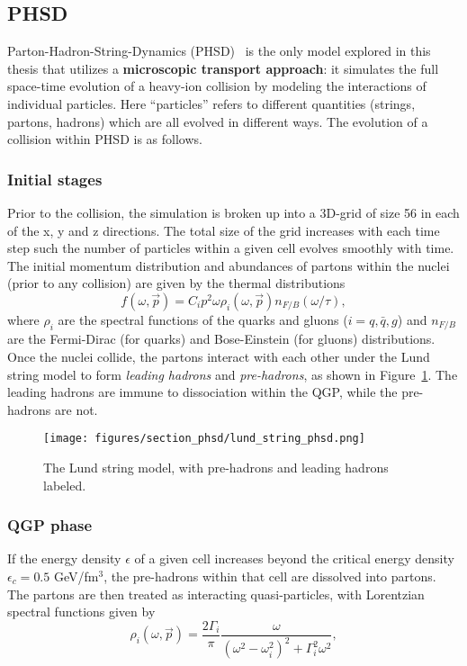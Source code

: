 \subsection{PHSD}

Parton-Hadron-String-Dynamics (PHSD)~\cite{PHSD1, PHSD2} is the only model explored in this thesis that utilizes a \textbf{microscopic transport approach}: it simulates the full space-time evolution of a heavy-ion collision by modeling the interactions of individual particles. Here ``particles'' refers to different quantities (strings, partons, hadrons) which are all evolved in different ways. The evolution of a collision within PHSD is as follows.

\subsubsection{Initial stages}
Prior to the collision, the simulation is broken up into a 3D-grid of size 56 in each of the x, y and z directions. The total size of the grid increases with each time step such the number of particles within a given cell evolves smoothly with time. The initial momentum distribution and abundances of partons within the nuclei (prior to any collision) are given by the thermal distributions
\begin{equation}
    f(\omega, \vec{p}) = C_i p^2 \omega \rho_i(\omega, \vec{p}) n_{F / B}(\omega / \tau),
\end{equation}
where $\rho_i$ are the spectral functions of the quarks and gluons ($i = q, \bar{q}, g$) and $n_{F / B}$ are the Fermi-Dirac (for quarks) and Bose-Einstein (for gluons) distributions. Once the nuclei collide, the partons interact with each other under the Lund string model to form \textit{leading hadrons} and \textit{pre-hadrons}, as shown in Figure~\ref{fig:lund_string_phsd}. The leading hadrons are immune to dissociation within the QGP, while the pre-hadrons are not. 

\begin{figure}[ht]
    \centering
    \texttt{[image: figures/section\_phsd/lund\_string\_phsd.png]}
    \caption{The Lund string model, with pre-hadrons and leading hadrons labeled.}
    \label{fig:lund_string_phsd}
\end{figure}

\subsubsection{QGP phase}
If the energy density $\epsilon$ of a given cell increases beyond the critical energy density $\epsilon_c = 0.5$ GeV/fm$^3$, the pre-hadrons within that cell are dissolved into partons. The partons are then treated as interacting quasi-particles, with Lorentzian spectral functions given by
\begin{equation}
    \rho_i(\omega, \vec{p}) = \frac{2 \Gamma_i}{\pi} \frac{\omega}{(\omega^2 - \omega_i^2)^2 + \Gamma_i^2 \omega^2},
\end{equation}






